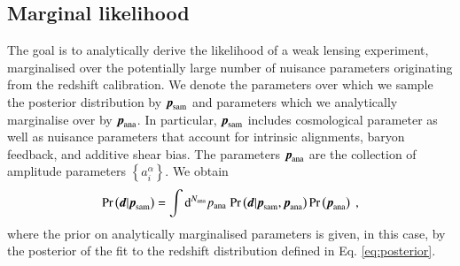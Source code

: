 \documentclass{aa}
\newcommand{\eq}[1]{\begin{equation}  #1 \end{equation}}
\newcommand{\br}[1]{\left( #1 \right)}
\newcommand{\bc}[1]{\left\{ #1 \right\}}
\newcommand{\dd}{{\rm d}}
\newcommand{\pr}{{\rm Pr}}
\begin{document}
\subsection{Marginal likelihood}
\label{sec:marginalisation}
The goal is to analytically derive the likelihood of a weak lensing experiment, marginalised over the potentially large number of nuisance parameters originating from the redshift calibration. We denote the parameters over which we sample the posterior distribution by $\boldsymbol{p}_{\rm sam}$ and parameters which we analytically marginalise over by $\boldsymbol{p}_{\rm ana}$. In particular, $\boldsymbol{p}_{\rm sam}$ includes cosmological parameter as well as nuisance parameters that account for intrinsic alignments, baryon feedback, and additive shear bias. The parameters $\boldsymbol{p}_{\rm ana}$ are the collection of amplitude parameters $\bc{a_i^\alpha}$. We obtain
\eq{
\pr \br{\boldsymbol{d} | \boldsymbol{p}_{\rm sam}} = \int \dd^{N_{\rm ana}} p_{\rm ana}\; \pr \br{\boldsymbol{d} | \boldsymbol{p}_{\rm sam}, \boldsymbol{p}_{\rm ana}} \pr \br{\boldsymbol{p}_{\rm ana}}\;,
}
where the prior on analytically marginalised parameters is given, in this case, by the posterior of the fit to the redshift distribution defined in Eq. \eqref{eq:posterior}.
\end{document}
